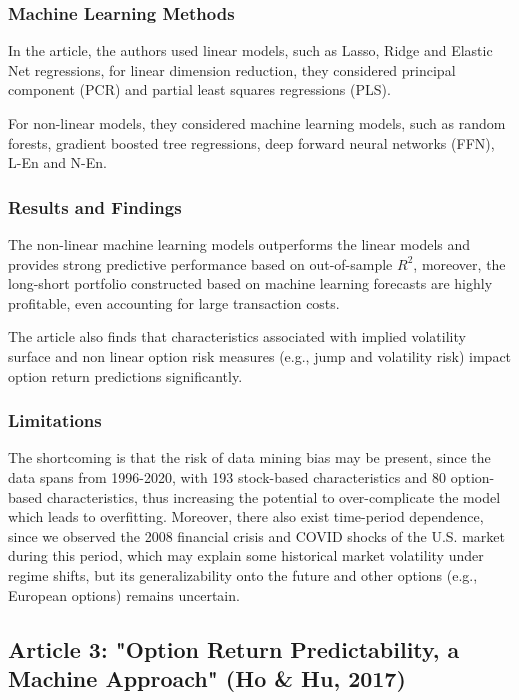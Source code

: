 \documentclass[oneside, 12pt]{article}
\newcommand*{\1}{\text{\scalebox{1.1}{\usefont{U}{bbold}{m}{n}1}}}
\begin{document}
\subsubsection{Machine Learning Methods}
In the article, the authors used linear models, such as Lasso, Ridge and Elastic Net regressions, for linear dimension reduction, they considered principal component (PCR) and partial least squares regressions (PLS). \newline

For non-linear models, they considered machine learning models, such as random forests, gradient boosted tree regressions, deep forward neural networks (FFN), L-En and N-En.

\subsubsection{Results and Findings}
The non-linear machine learning models outperforms the linear models and provides strong predictive performance based on out-of-sample $R^2$, moreover, the long-short portfolio constructed based on machine learning forecasts are highly profitable, even accounting for large transaction costs.  \newline

The article also finds that characteristics associated with implied volatility surface and non linear option risk measures (e.g., jump and volatility risk) impact option return predictions significantly.  

\subsubsection{Limitations}
The shortcoming is that the risk of data mining bias may be present, since the data spans from 1996-2020, with 193 stock-based characteristics and 80 option-based characteristics, thus increasing the potential to over-complicate the model which leads to overfitting. Moreover, there also exist time-period dependence, since we observed the 2008 financial crisis and COVID shocks of the U.S. market during this period, which may explain some historical market volatility under regime shifts, but its generalizability onto the future and other options (e.g., European options) remains uncertain.  
\newpage

\subsection{Article 3: "Option Return Predictability, a Machine Approach" (Ho \& Hu, 2017)}
\end{document}
